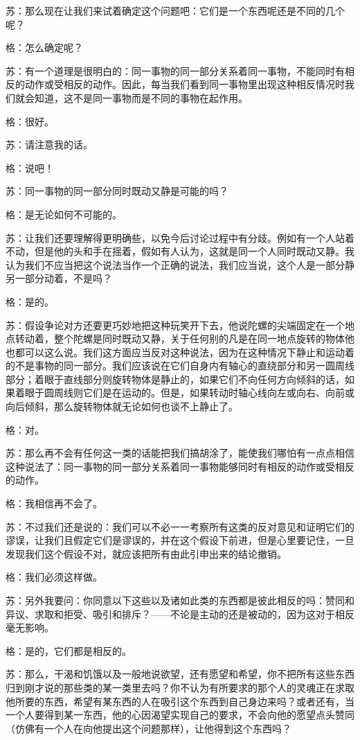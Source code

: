 \documentclass[12pt,oneside]{book}
\begin{document}
苏：那么现在让我们来试着确定这个问题吧：它们是一个东西呢还是不同的几个呢？

格：怎么确定呢？

苏：有一个道理是很明白的：同一事物的同一部分关系着同一事物，不能同时有相反的动作或受相反的动作。因此，每当我们看到同一事物里出现这种相反情况时我们就会知道，这不是同一事物而是不同的事物在起作用。

格：很好。

苏：请注意我的话。

格：说吧！

苏：同一事物的同一部分同时既动又静是可能的吗？

格：是无论如何不可能的。

苏：让我们还要理解得更明确些，以免今后讨论过程中有分歧。例如有一个人站着不动，但是他的头和手在摇着，假如有人认为，这就是同一个人同时既动又静。我认为我们不应当把这个说法当作一个正确的说法，我们应当说，这个人是一部分静另一部分动着，不是吗？

格：是的。

苏：假设争论对方还要更巧妙地把这种玩笑开下去，他说陀螺的尖端固定在一个地点转动着，整个陀螺是同时既动又静，关于任何别的凡是在同一地点旋转的物体他也都可以这么说。我们这方面应当反对这种说法，因为在这种情况下静止和运动着的不是事物的同一部分。我们应该说在它们自身内有轴心的直绕部分和另一圆周线部分；着眼于直线部分则旋转物体是静止的，如果它们不向任何方向倾斜的话，如果着眼于圆周线则它们是在运动的。但是，如果转动时轴心线向左或向右、向前或向后倾斜，那么旋转物体就无论如何也谈不上静止了。

格：对。

苏：那么再不会有任何这一类的话能把我们搞胡涂了，能使我们哪怕有一点点相信这种说法了：同一事物的同一部分关系着同一事物能够同时有相反的动作或受相反的动作。

格：我相信再不会了。

苏：不过我们还是说的：我们可以不必一一考察所有这类的反对意见和证明它们的谬误，让我们且假定它们是谬误的，并在这个假设下前进，但是心里要记住，一旦发现我们这个假设不对，就应该把所有由此引申出来的结论撤销。

格：我们必须这样做。

苏：另外我要问：你同意以下这些以及诸如此类的东西都是彼此相反的吗：赞同和异议、求取和拒受、吸引和排斥？——不论是主动的还是被动的，因为这对于相反毫无影响。

格：是的，它们都是相反的。

苏：那么，干渴和饥饿以及一般地说欲望，还有愿望和希望，你不把所有这些东西归到刚才说的那些类的某一类里去吗？你不认为有所要求的那个人的灵魂正在求取他所要的东西，希望有某东西的人在吸引这个东西到自己身边来吗？或者还有，当一个人要得到某一东西，他的心因渴望实现自己的要求，不会向他的愿望点头赞同（仿佛有一个人在向他提出这个问题那样），让他得到这个东西吗？
\end{document}
